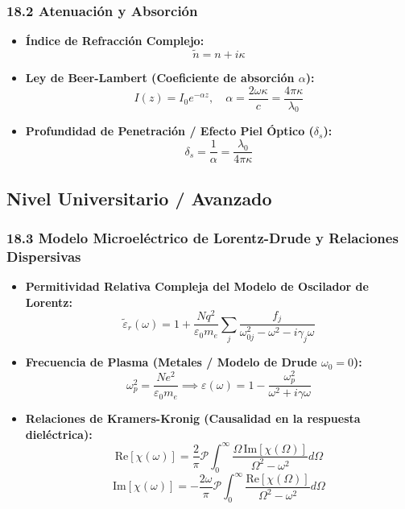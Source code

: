 \documentclass[11pt,a4paper]{article}
\begin{document}
\subsubsection*{18.2 Atenuación y Absorción}

\begin{itemize}
  \item \textbf{Índice de Refracción Complejo:}
  \[
    \tilde{n} = n + i \kappa
  \]
  \item \textbf{Ley de Beer-Lambert (Coeficiente de absorción $\alpha$):}
  \[
    I(z) = I_0 e^{-\alpha z}, \quad \alpha = \frac{2\omega\kappa}{c} = \frac{4\pi\kappa}{\lambda_0}
  \]
  \item \textbf{Profundidad de Penetración / Efecto Piel Óptico ($\delta_s$):}
  \[
    \delta_s = \frac{1}{\alpha} = \frac{\lambda_0}{4\pi\kappa}
  \]
\end{itemize}

\subsection*{Nivel Universitario / Avanzado}

\subsubsection*{18.3 Modelo Microeléctrico de Lorentz-Drude y Relaciones Dispersivas}

\begin{itemize}
  \item \textbf{Permitividad Relativa Compleja del Modelo de Oscilador de Lorentz:}
  \[
    \tilde{\varepsilon}_r(\omega) = 1 + \frac{N q^2}{\varepsilon_0 m_e} \sum_j \frac{f_j}{\omega_{0j}^2 - \omega^2 - i\gamma_j \omega}
  \]
  \item \textbf{Frecuencia de Plasma (Metales / Modelo de Drude $\omega_{0} = 0$):}
  \[
    \omega_p^2 = \frac{N e^2}{\varepsilon_0 m_e} \implies \varepsilon(\omega) = 1 - \frac{\omega_p^2}{\omega^2 + i\gamma\omega}
  \]
  \item \textbf{Relaciones de Kramers-Kronig (Causalidad en la respuesta dieléctrica):}
  \[
    \text{Re}[\chi(\omega)] = \frac{2}{\pi} \mathcal{P} \int_0^\infty \frac{\Omega \, \text{Im}[\chi(\Omega)]}{\Omega^2 - \omega^2} d\Omega
  \]
  \[
    \text{Im}[\chi(\omega)] = -\frac{2\omega}{\pi} \mathcal{P} \int_0^\infty \frac{\text{Re}[\chi(\Omega)]}{\Omega^2 - \omega^2} d\Omega
  \]
\end{itemize}
\end{document}
